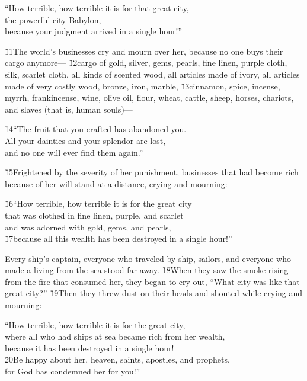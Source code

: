 \begin{poetry}
\poeml ``How terrible, how terrible it is for that great city, \\
\poemll    the powerful city Babylon, \\
\poemlll       because your judgment arrived in a single hour!''
\end{poetry}

\v{11}The world's businesses cry and mourn over her, because no one buys their cargo anymore--- \v{12}cargo of gold, silver, gems, pearls, fine linen, purple cloth, silk, scarlet cloth, all kinds of scented wood, all articles made of ivory, all articles made of very costly wood, bronze, iron, marble, \v{13}cinnamon, spice, incense, myrrh, frankincense, wine, olive oil, flour, wheat, cattle, sheep, horses, chariots, and slaves (that is, human souls)---

\begin{poetry}
\poeml \v{14}``The fruit that you crafted has abandoned you. \\
\poemll    All your dainties and your splendor are lost, \\
\poemlll       and no one will ever find them again.''
\end{poetry}

\v{15}Frightened by the severity of her punishment, businesses that had become rich because of her will stand at a distance, crying and mourning:

\begin{poetry}
\poeml \v{16}``How terrible, how terrible it is for the great city \\
\poemll    that was clothed in fine linen, purple, and scarlet \\
\poemlll       and was adorned with gold, gems, and pearls, \\
\poeml \v{17}because all this wealth has been destroyed in a single hour!''
\end{poetry}

Every ship's captain, everyone who traveled by ship, sailors, and everyone who made a living from the sea stood far away. \v{18}When they saw the smoke rising from the fire that consumed her, they began to cry out, ``What city was like that great city?'' \v{19}Then they threw dust on their heads and shouted while crying and mourning:

\begin{poetry}
\poeml ``How terrible, how terrible it is for the great city, \\
\poemll    where all who had ships at sea became rich from her wealth, \\
\poemlll       because it has been destroyed in a single hour! \\
\poeml \v{20}Be happy about her, heaven, saints, apostles, and prophets, \\
\poemll    for God has condemned her for you!''
\end{poetry}

